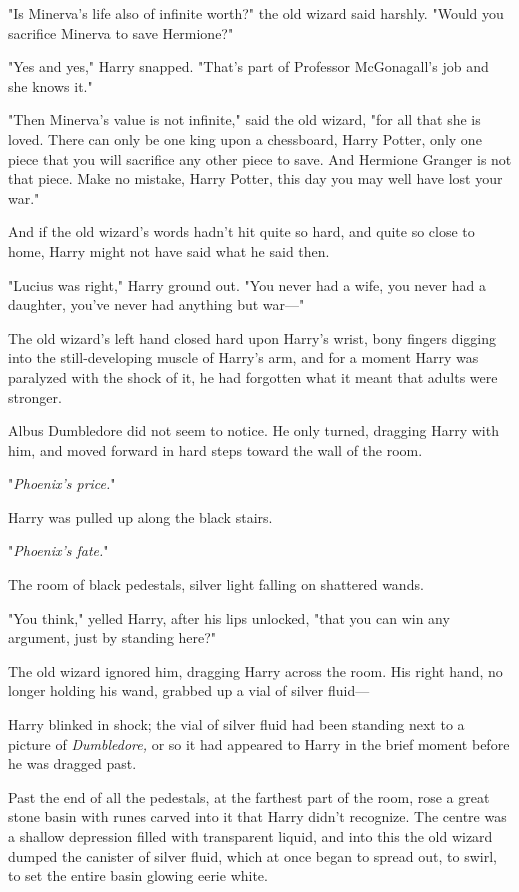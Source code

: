 "Is Minerva's life also of infinite worth?" the old wizard said harshly. "Would
you sacrifice Minerva to save Hermione?"

"Yes and yes," Harry snapped. "That's part of Professor McGonagall's job and
she knows it."

"Then Minerva's value is not infinite," said the old wizard, "for all that she
is loved. There can only be one king upon a chessboard, Harry Potter, only one
piece that you will sacrifice any other piece to save. And Hermione Granger is
not that piece. Make no mistake, Harry Potter, this day you may well have lost
your war."

And if the old wizard's words hadn't hit quite so hard, and quite so close to
home, Harry might not have said what he said then.

"Lucius was right," Harry ground out. "You never had a wife, you never had a
daughter, you've never had anything but war---"

The old wizard's left hand closed hard upon Harry's wrist, bony fingers digging
into the still-developing muscle of Harry's arm, and for a moment Harry was
paralyzed with the shock of it, he had forgotten what it meant that adults were
stronger.

Albus Dumbledore did not seem to notice. He only turned, dragging Harry with
him, and moved forward in hard steps toward the wall of the room.

"\emph{Phoenix's price.}"

Harry was pulled up along the black stairs.

"\emph{Phoenix's fate.}"

The room of black pedestals, silver light falling on shattered wands.

"You think," yelled Harry, after his lips unlocked, "that you can win any
argument, just by standing here?"

The old wizard ignored him, dragging Harry across the room. His right hand, no
longer holding his wand, grabbed up a vial of silver fluid---

Harry blinked in shock; the vial of silver fluid had been standing next to a
picture of \emph{Dumbledore,} or so it had appeared to Harry in the brief
moment before he was dragged past.

Past the end of all the pedestals, at the farthest part of the room, rose a
great stone basin with runes carved into it that Harry didn't recognize. The
centre was a shallow depression filled with transparent liquid, and into this
the old wizard dumped the canister of silver fluid, which at once began to
spread out, to swirl, to set the entire basin glowing eerie white.

